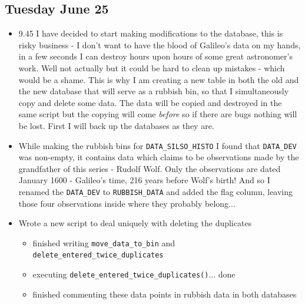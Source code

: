 \documentclass[12pt]{article}
\begin{document}
\subsection{Tuesday June 25}
\begin{itemize}
    \item 9.45 I have decided to start making modifications to the database, this is risky business - I don't want to have the blood of Galileo's data on my hands, in a few seconds I can destroy hours upon hours of some great astronomer's work. Well not actually but it could be hard to clean up mistakes - which would be a shame. This is why I am creating a new table in both the old and the new database that will serve as a rubbish bin, so that I simultaneously copy and delete some data. The data will be copied and destroyed in the same script but the copying will come \textit{before} so if there are bugs nothing will be lost. First I will back up the databases as they are.
    \item While making the rubbish bins for \texttt{DATA\_SILSO\_HISTO} I found that \texttt{DATA\_DEV} was non-empty, it contains data which claims to be observations made by the grandfather of this series - Rudolf Wolf. Only the observations are dated January 1600 - Galileo's time, 216 years before Wolf's birth! And so I renamed the \texttt{DATA\_DEV} to \texttt{RUBBISH\_DATA} and added the flag column, leaving those four observations inside where they probably belong...
    \item Wrote a new script to deal uniquely with deleting the duplicates
    \begin{itemize}
        \item finished writing \texttt{move\_data\_to\_bin} and \texttt{delete\_entered\_twice\_duplicates}
        \item executing \texttt{delete\_entered\_twice\_duplicates()}... done
        \item finished commenting these data points in rubbish data in both databases
    \end{itemize}
\end{itemize}
    
\end{document}
